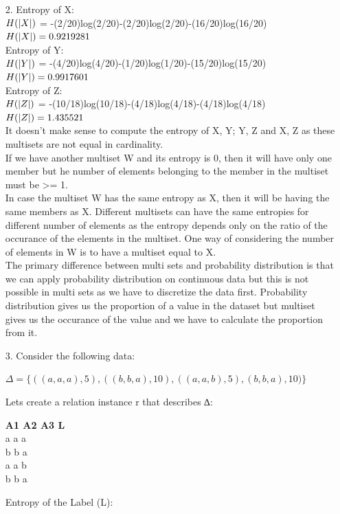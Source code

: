 \documentclass[12pt]{article}
\begin{document}
\begin{enumerate}
\item [2.] 
Entropy of X: \\
$H(\arrowvert X \arrowvert)$ = -(2/20)log(2/20)-(2/20)log(2/20)-(16/20)log(16/20)\\
$H(\arrowvert X \arrowvert) = 0.9219281$\\

Entropy of Y:\\
$H(\arrowvert Y \arrowvert)$ = -(4/20)log(4/20)-(1/20)log(1/20)-(15/20)log(15/20)\\
$H(\arrowvert Y \arrowvert) = 0.9917601$\\

Entropy of Z: \\
$H(\arrowvert Z \arrowvert)$ = -(10/18)log(10/18)-(4/18)log(4/18)-(4/18)log(4/18)\\
$H(\arrowvert Z \arrowvert) = 1.435521$\\

It doesn't make sense to compute the entropy of X, Y; Y, Z and X, Z as these multisets are not equal in cardinality.\\

If we have another multiset W and its entropy is 0, then it will have only one member but he number of elements belonging to the member in the multiset must be >= 1.\\

In case the multiset W has the same entropy as X, then it will be having the same members as X. Different multisets can have the same entropies for different number of elements as the entropy depends only on the ratio of the occurance of the elements in the multiset. One way of considering the number of elements in W is to have a multiset equal to X. \\

The primary difference between multi sets and probability distribution is that we can apply probability distribution on continuous data but this is not possible in multi sets as we have to discretize the data first. Probability distribution gives us the proportion of a value in the dataset but multiset gives us the occurance of the value and we have to calculate the proportion from it. \\
\item [3.] Consider the following data:
\begin{center}
	$\Delta = \{((a,a,a),5),((b,b,a),10),((a,a,b),5),(b,b,a),10)\}$
\end{center}
Lets create a relation instance r that describes ∆: \\
\begin{center}
 \textbf{A1 \qquad A2 \qquad A3 \qquad L} \\
 a \qquad \quad a \qquad \quad a \qquad {}  \\
 b \qquad \quad b \qquad \quad a \qquad {}  \\
 a \qquad \quad a \qquad \quad b \qquad {}  \\
 b \qquad \quad b \qquad \quad a \qquad {}  \\
 \end{center}
Entropy of the Label (L): \\


\end{enumerate}
\end{document}
